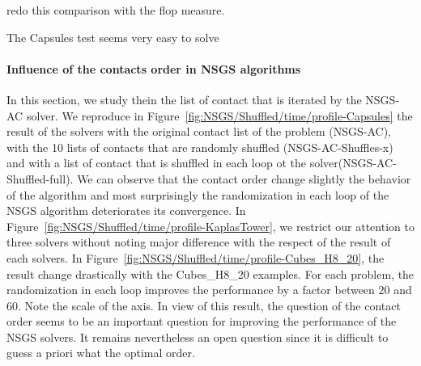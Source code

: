 \begin{ndrva}
  \item redo this comparison with the flop measure.
  \item The Capsules test seems very easy to solve
\end{ndrva}

\paragraph{Influence of the contacts order  in NSGS algorithms}

In this section, we study thein the list of contact that is iterated by the NSGS-AC solver. We reproduce in Figure~\ref{fig:NSGS/Shuffled/time/profile-Capsules} the result of the solvers with the original contact list of the problem (NSGS-AC), with the 10 lists of contacts that are randomly shuffled (NSGS-AC-Shuffles-x) and with a list of contact that is shuffled in each loop ot the solver(NSGS-AC-Shuffled-full). We can observe that the contact order change slightly the behavior of the algorithm and most surprisingly the randomization in each loop of the NSGS algorithm deteriorates its convergence. In Figure~\ref{fig:NSGS/Shuffled/time/profile-KaplasTower}, we restrict our attention to three solvers without noting major difference with the respect of the result of each solvers. In Figure~\ref{fig:NSGS/Shuffled/time/profile-Cubes_H8_20}, the result change drastically with the Cubes\_H8\_20 examples. For each problem, the randomization  in each loop improves the performance by a factor between $20$ and $60$. Note the scale of the axis. In view of this result, the question of the contact order seems to be an important question for improving the performance of the NSGS solvers. It remains nevertheless an open question since it is difficult to guess a priori what the optimal order.


